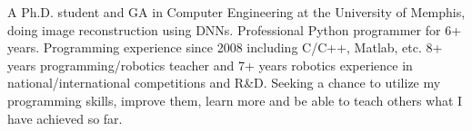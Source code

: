

\begin{cvparagraph}

A Ph.D. student and GA in Computer Engineering at the University of Memphis, doing image reconstruction using DNNs. Professional Python programmer for 6+ years. Programming experience since 2008 including C/C++, Matlab, etc. 8+ years programming/robotics teacher and 7+ years robotics experience in national/international competitions and R\&D. Seeking a chance to utilize my programming skills, improve them, learn more and be able to teach others what I have achieved so far. 
\end{cvparagraph}